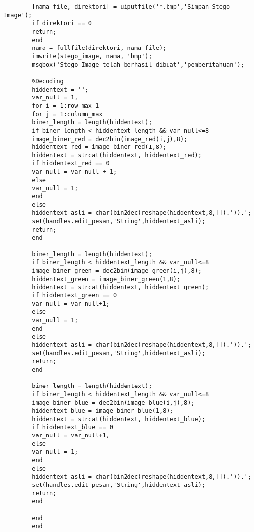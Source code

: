 \begin{verbatim}
		[nama_file, direktori] = uiputfile('*.bmp','Simpan Stego Image');
		if direktori == 0
		return;
		end
		nama = fullfile(direktori, nama_file);
		imwrite(stego_image, nama, 'bmp');
		msgbox('Stego Image telah berhasil dibuat','pemberitahuan');	
	
		%Decoding
		hiddentext = '';
		var_null = 1;
		for i = 1:row_max-1
		for j = 1:column_max
		biner_length = length(hiddentext);
		if biner_length < hiddentext_length && var_null<=8
		image_biner_red = dec2bin(image_red(i,j),8); 
		hiddentext_red = image_biner_red(1,8);
		hiddentext = strcat(hiddentext, hiddentext_red);
		if hiddentext_red == 0
		var_null = var_null + 1;
		else
		var_null = 1;
		end   
		else
		hiddentext_asli = char(bin2dec(reshape(hiddentext,8,[]).')).';
		set(handles.edit_pesan,'String',hiddentext_asli);
		return;
		end
		
		biner_length = length(hiddentext);
		if biner_length < hiddentext_length && var_null<=8
		image_biner_green = dec2bin(image_green(i,j),8);
		hiddentext_green = image_biner_green(1,8);
		hiddentext = strcat(hiddentext, hiddentext_green);
		if hiddentext_green == 0
		var_null = var_null+1;
		else
		var_null = 1;
		end   
		else
		hiddentext_asli = char(bin2dec(reshape(hiddentext,8,[]).')).';
		set(handles.edit_pesan,'String',hiddentext_asli);
		return;
		end
		
		biner_length = length(hiddentext);
		if biner_length < hiddentext_length && var_null<=8
		image_biner_blue = dec2bin(image_blue(i,j),8);
		hiddentext_blue = image_biner_blue(1,8);
		hiddentext = strcat(hiddentext, hiddentext_blue);
		if hiddentext_blue == 0
		var_null = var_null+1;
		else
		var_null = 1;
		end   
		else
		hiddentext_asli = char(bin2dec(reshape(hiddentext,8,[]).')).';
		set(handles.edit_pesan,'String',hiddentext_asli);
		return;
		end
		
		end
		end
	\end{verbatim}
